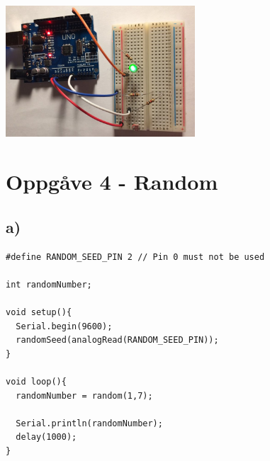 \documentclass[12pt,a4paper]{article}
\begin{document}
    \begin{center}
      \includegraphics[width=200pt]{02_3_b.png}
    \end{center}

  \newpage

  \section*{Oppgåve 4 - Random}
    \subsection*{a)}
    \begin{lstlisting}[language=Arduino, basicstyle=\tiny]
#define RANDOM_SEED_PIN 2 // Pin 0 must not be used

int randomNumber;

void setup(){
  Serial.begin(9600);  
  randomSeed(analogRead(RANDOM_SEED_PIN));
}

void loop(){
  randomNumber = random(1,7);

  Serial.println(randomNumber);
  delay(1000);
}
    \end{lstlisting}
\end{document}
